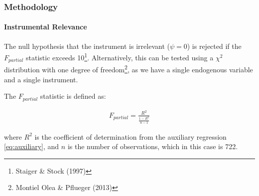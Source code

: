 
\begin{frame}
    \frametitle{Methodology}
    \framesubtitle{Instrumental Relevance}
    
    The null hypothesis that the instrument is irrelevant ($\psi = 0$) is rejected if the $F_{partial}$ statistic exceeds 10\footnote{Staiger \& Stock (1997)}. Alternatively, this can be tested using a $\chi^2$ distribution with one degree of freedom\footnote{Montiel Olea \& Pflueger (2013)}, as we have a single endogenous variable and a single instrument.
    
    The $F_{partial}$ statistic is defined as:
    
    \begin{align}
        F_{partial} = \frac{R^2}{\frac{1-R^2}{n - 1}}
    \end{align}
    
    where $R^2$ is the coefficient of determination from the auxiliary regression \ref{eq:auxiliary}, and $n$ is the number of observations, which in this case is 722.


\end{frame}
